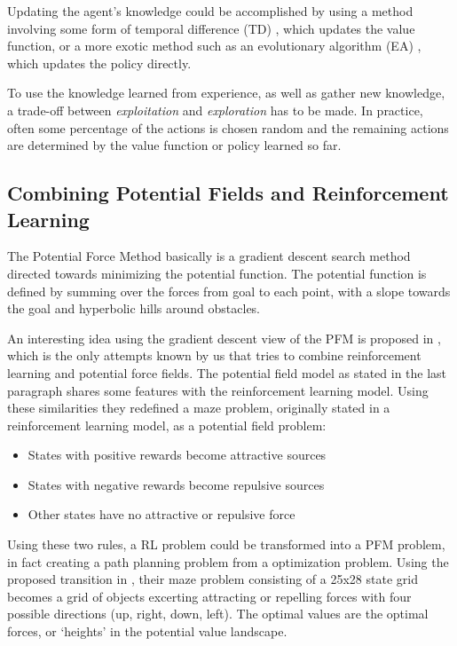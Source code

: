 \documentclass[11pt]{article}
\begin{document}
Updating the agent's knowledge could be accomplished by using a method involving some form of temporal difference (TD) \cite[p.133-157]{sutton98}, which updates the value function, or a more exotic method such as an evolutionary algorithm (EA) \cite{li-juan08}, which updates the policy directly. 

To use the knowledge learned from experience, as well as gather new knowledge, a trade-off between \emph{exploitation} and \emph{exploration} has to be made. In practice, often some percentage of the actions is chosen random and the remaining actions are determined by the value function or policy learned so far.

\subsection{Combining Potential Fields and Reinforcement Learning}


The Potential Force Method basically is a gradient descent search method directed towards minimizing the potential function. The potential function is defined by summing over the forces from goal to each point, with a slope towards the goal and hyperbolic hills around obstacles.


An interesting idea using the gradient descent view of the PFM is proposed in \cite{li-juan08}, which is the only attempts known by us that tries to combine reinforcement learning and potential force fields. The potential field model as stated in the last paragraph shares some features with the reinforcement learning model. Using these similarities they redefined a maze problem, originally stated in a reinforcement learning model, as a potential field problem:

\begin{itemize}
 \item States with positive rewards become attractive sources
 \item States with negative rewards become repulsive sources
 \item Other states have no attractive or repulsive force
\end{itemize}

Using these two rules, a RL problem could be transformed into a PFM problem, in fact creating a path planning problem from a optimization problem. Using the proposed transition in \cite{li-juan08}, their maze problem consisting of a 25x28 state grid becomes a grid of objects excerting attracting or repelling forces with four possible directions (up, right, down, left). The optimal values are the optimal forces, or `heights' in the potential value landscape.
\end{document}
